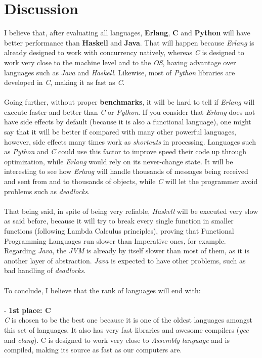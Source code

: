 \documentclass[conference]{IEEEtran}
\begin{document}
\section{Discussion}
I believe that, after evaluating all languages, \textbf{Erlang}, \textbf{C} and \textbf{Python} will have better performance than \textbf{Haskell} and \textbf{Java}. That will happen because \textit{Erlang} is already designed to work with concurrency natively, whereas \textit{C} is designed to work very close to the machine level and to the \textit{OS}, having advantage over languages such as \textit{Java} and \textit{Haskell}. Likewise, most of \textit{Python} libraries are developed in \textit{C}, making it as fast as \textit{C}.\\\\
Going further, without proper \textbf{benchmarks}, it will be hard to tell if \textit{Erlang} will execute faster and better than \textit{C} or \textit{Python}. If you consider that \textit{Erlang} does not have side effects by default (because it is also a functional language), one might say that it will be better if compared with many other powerful languages, however, side effects many times work as \textit{shortcuts} in processing. Languages such as \textit{Python} and \textit{C} could use this factor to improve speed their code up through optimization, while \textit{Erlang} would rely on its never-change state. It will be interesting to see how \textit{Erlang} will handle thousands of messages being received and sent from and to thousands of objects, while \textit{C} will let the programmer avoid problems such as \textit{deadlocks}.\\\\
That being said, in spite of being very reliable, \textit{Haskell} will be executed very slow as said before, because it will try to break every single function in smaller functions (following Lambda Calculus principles), proving that Functional Programming Languages run slower than Imperative ones, for example. Regarding \textit{Java}, the \textit{JVM} is already by itself slower than most of them, as it is another layer of abstraction. \textit{Java} is expected to have other problems, such as bad handling of \textit{deadlocks}.\\\\
To conclude, I believe that the rank of languages will end with:
\\\\
- \textbf{1st place: C}\\
\textit{C} is chosen to be the best one because it is one of the oldest languages amongst this set of languages. It also has very fast libraries and awesome compilers (\textit{gcc} and \textit{clang}). C is designed to work very close to \textit{Assembly language} and is compiled, making its source as fast as our computers are.
\end{document}
